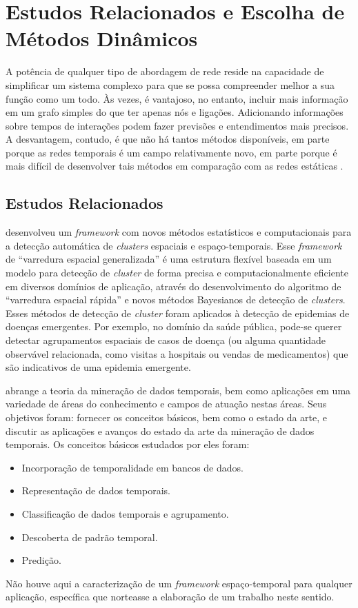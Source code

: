\section{Estudos Relacionados e Escolha de Métodos Dinâmicos}
\label{sec:trabalhos-relacionados}

A potência de qualquer tipo de abordagem de rede reside na capacidade de simplificar um sistema complexo para que se possa compreender melhor a sua função como um todo. Às vezes, é vantajoso, no entanto, incluir mais informação em um grafo simples do que ter apenas nós e ligações. Adicionando informações sobre tempos de interações podem fazer previsões e entendimentos mais precisos. A desvantagem, contudo, é que não há tantos métodos disponíveis, em parte porque as redes temporais é um campo relativamente novo, em parte porque é mais difícil de desenvolver tais métodos em comparação com as redes estáticas \cite{holme:colloquium}.

\subsection{Estudos Relacionados}
\label{subsec:estudos}

 desenvolveu um \emph{framework} com novos métodos estatísticos e computacionais para a detecção automática de \emph{clusters} espaciais e espaço-temporais. Esse \emph{framework} de “varredura espacial generalizada” é uma estrutura flexível baseada em um modelo para detecção de \emph{cluster} de forma precisa e computacionalmente eficiente em diversos domínios de aplicação, através do desenvolvimento do algoritmo de “varredura espacial rápida” e novos métodos Bayesianos de detecção de \emph{clusters}. Esses métodos de detecção de \emph{cluster} foram aplicados à detecção de epidemias de doenças emergentes. Por exemplo, no domínio da saúde pública, pode-se querer detectar agrupamentos espaciais de casos de doença (ou alguma quantidade observável relacionada, como visitas a hospitais ou vendas de medicamentos) que são indicativos de uma epidemia emergente.

 abrange a teoria da mineração de dados temporais, bem como aplicações em uma variedade de áreas do conhecimento e campos de atuação nestas áreas. Seus objetivos foram: fornecer os conceitos básicos, bem como o estado da arte, e discutir as aplicações e avanços do estado da arte da mineração de dados temporais. Os conceitos básicos estudados por eles foram:
\begin{itemize}
\item Incorporação de temporalidade em bancos de dados.
\item Representação de dados temporais.
\item Classificação de dados temporais e agrupamento.
\item Descoberta de padrão temporal.
\item Predição.
\end{itemize}
Não houve aqui a caracterização de um \emph{framework} espaço-temporal para qualquer aplicação, específica que norteasse a elaboração de um trabalho neste sentido. 

